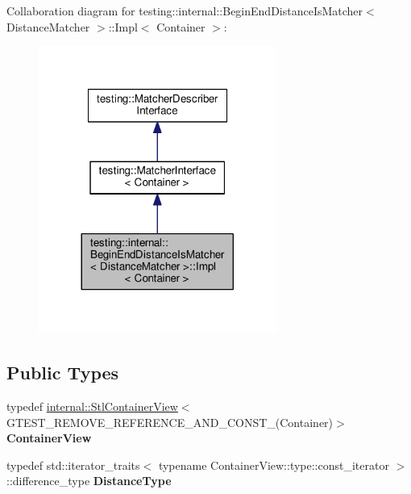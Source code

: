 Collaboration diagram for testing\+:\+:internal\+:\+:Begin\+End\+Distance\+Is\+Matcher$<$ Distance\+Matcher $>$\+:\+:Impl$<$ Container $>$\+:\nopagebreak
\begin{figure}[H]
\begin{center}
\leavevmode
\includegraphics[width=221pt]{classtesting_1_1internal_1_1BeginEndDistanceIsMatcher_1_1Impl__coll__graph}
\end{center}
\end{figure}
\subsection*{Public Types}
\begin{DoxyCompactItemize}
\item 
typedef \hyperlink{classtesting_1_1internal_1_1StlContainerView}{internal\+::\+Stl\+Container\+View}$<$ G\+T\+E\+S\+T\+\_\+\+R\+E\+M\+O\+V\+E\+\_\+\+R\+E\+F\+E\+R\+E\+N\+C\+E\+\_\+\+A\+N\+D\+\_\+\+C\+O\+N\+S\+T\+\_\+(Container)$>$ {\bfseries Container\+View}\hypertarget{classtesting_1_1internal_1_1BeginEndDistanceIsMatcher_1_1Impl_a5c76ede38c6143430f56e02e9024f535}{}\label{classtesting_1_1internal_1_1BeginEndDistanceIsMatcher_1_1Impl_a5c76ede38c6143430f56e02e9024f535}

\item 
typedef std\+::iterator\+\_\+traits$<$ typename Container\+View\+::type\+::const\+\_\+iterator $>$\+::difference\+\_\+type {\bfseries Distance\+Type}\hypertarget{classtesting_1_1internal_1_1BeginEndDistanceIsMatcher_1_1Impl_a10d901c49e2793dae6bcce6fa1a4e9fe}{}\label{classtesting_1_1internal_1_1BeginEndDistanceIsMatcher_1_1Impl_a10d901c49e2793dae6bcce6fa1a4e9fe}

\end{DoxyCompactItemize}
